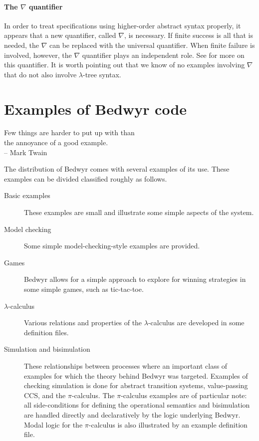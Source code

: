 \documentclass{article}
\begin{document}
\paragraph{The $\nabla$ quantifier}
In order to treat specifications using higher-order abstract syntax
properly, it appears that a new quantifier, called $\nabla$, is
necessary.  If finite success is all that is needed, the $\nabla$ can
be replaced with the universal quantifier.  When finite failure is
involved, however, the $\nabla$ quantifier plays an independent role.
See \cite{miller05tocl,tiu04phd,tiu05concur} for more on this
quantifier.  It is worth pointing out that we know of no examples
involving $\nabla$ that do not also involve $\lambda$-tree syntax.

\section{Examples of Bedwyr code}

\begin{flushright}
Few things are harder to put up with than\\
the annoyance of a good example.\\
    -- Mark Twain
\end{flushright}

The distribution of Bedwyr comes with several examples of its use.
These examples can be divided classified roughly as follows.

\begin{description}
\item[Basic examples] These examples are small and illustrate some
  simple aspects of the system.

\item[Model checking] Some simple model-checking-style examples are
  provided. 

\item[Games] Bedwyr allows for a simple approach to explore for
  winning strategies in some simple games, such as tic-tac-toe.

\item[$\lambda$-calculus] Various relations and properties of the
  $\lambda$-calculus are developed in some definition files.

\item[Simulation and bisimulation] These relationships between
  processes where an important class of examples for which the theory
  behind Bedwyr was targeted.  Examples of checking simulation is done
  for abstract transition systems, value-passing CCS, and the
  $\pi$-calculus.  The $\pi$-calculus examples are of particular note:
  all side-conditions for defining the operational semantics and
  bisimulation are handled directly and declaratively by the logic
  underlying Bedwyr.   Modal logic for the $\pi$-calculus is also
  illustrated by an example definition file.

\end{description}
\end{document}
